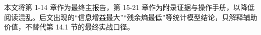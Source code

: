 本文将第 1-14 章作为最终主报告，第 15-21 章作为附录证据与操作手册，以降低阅读混乱。后文出现的“信息增益最大”“残余熵最低”等统计模型结论，只解释辅助价值，不替代第 14.1 节的最终实战口径。
